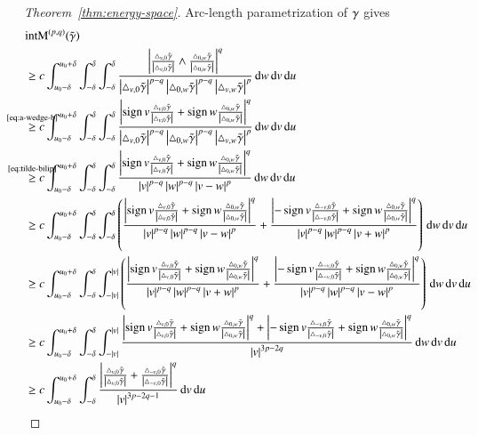 \begin{proof}[Theorem~\ref{thm:energy-space}]
Arc-length parametrization of $\gamma$ gives
\renewcommand{\T}[3][\tg]{\triangle_{#2,#3}{#1}}
\begin{equation}\label{eq:tilde-g}
\begin{split}
 &\E(\tilde\g) \\
 &\ge c\int_{u_0-\delta}^{u_0+\delta}\int_{-\delta}^\delta\int_{-\delta}^\delta
 \frac{\abs{\fracabs{\T v0}\wedge\fracabs{\T 0w}}^{q}}{{\abs{\T v0}^{p-q}\abs{\T 0w}^{p-q}\abs{\T vw}^p}}
 {\d w\d v\d u} \\
 &\refeq[\ge]{a-wedge-b} c\int_{u_0-\delta}^{u_0+\delta}\int_{-\delta}^\delta\int_{-\delta}^\delta
 \frac{\abs{\sign v\fracabs{\T v0}+\sign w\fracabs{\T 0w}}^{q}}{{\abs{\T v0}^{p-q}\abs{\T 0w}^{p-q}\abs{\T vw}^p}}
 {\d w\d v\d u} \\
 &\refeq[\ge]{tilde-bilip} c\int_{u_0-\delta}^{u_0+\delta}\int_{-\delta}^\delta\int_{-\delta}^\delta
 \frac{\abs{\sign v\fracabs{\T v0}+\sign w\fracabs{\T 0w}}^{q}}{{\abs{v}^{p-q}\abs{w}^{p-q}\abs{v-w}^p}}
 {\d w\d v\d u} \\
 &\ge c\int_{u_0-\delta}^{u_0+\delta}\int_{-\delta}^\delta\int_{-\delta}^\delta
 \br{\frac{\abs{\sign v\fracabs{\T v0}+\sign w\fracabs{\T 0w}}^{q}}{{\abs{v}^{p-q}\abs{w}^{p-q}\abs{v-w}^p}}
 + \frac{\abs{-\sign v\fracabs{\T {-v}0}+\sign w\fracabs{\T 0w}}^{q}}{{\abs{v}^{p-q}\abs{w}^{p-q}\abs{v+w}^p}}}
 {\d w\d v\d u} \\
 &\ge c\int_{u_0-\delta}^{u_0+\delta}\int_{-\delta}^{\delta}\int_{-\abs v}^{\abs v}
 \br{\frac{\abs{\sign v\fracabs{\T v0}+\sign w\fracabs{\T 0w}}^{q}}{{\abs{v}^{p-q}\abs{w}^{p-q}\abs{v+w}^p}}
 +\frac{\abs{-\sign v\fracabs{\T {-v}0}+\sign w\fracabs{\T 0w}}^{q}}{{\abs{v}^{p-q}\abs{w}^{p-q}\abs{v-w}^p}}}
 {\d w\d v\d u} \\
 &\ge c\int_{u_0-\delta}^{u_0+\delta}\int_{-\delta}^{\delta}\int_{-\abs v}^{\abs v}
 \frac{\abs{\sign v\fracabs{\T v0}+\sign w\fracabs{\T 0w}}^{q}
 +\abs{-\sign v\fracabs{\T {-v}0}+\sign w\fracabs{\T 0w}}^{q}}{{\abs{v}^{3p-2q}}}
 {\d w\d v\d u} \\
 &\ge c\int_{u_0-\delta}^{u_0+\delta}\int_{-\delta}^{\delta}
 \frac{\abs{\fracabs{\T v0}+{\fracabs{\T {-v}0}}}^{q}}{{\abs{v}^{3p-2q-1}}}
 {\d v\d u}
% 
% 

\end{split}
\end{equation}
\end{proof}
